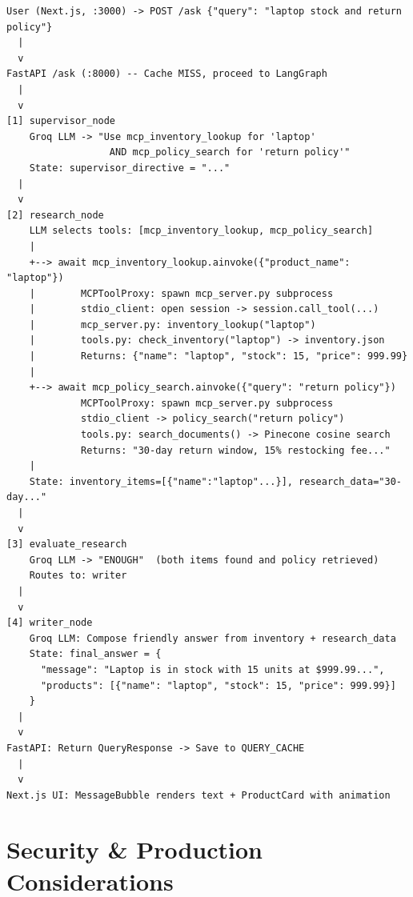 \documentclass[12pt]{article}
\begin{document}
\begin{lstlisting}
User (Next.js, :3000) -> POST /ask {"query": "laptop stock and return policy"}
  |
  v
FastAPI /ask (:8000) -- Cache MISS, proceed to LangGraph
  |
  v
[1] supervisor_node
    Groq LLM -> "Use mcp_inventory_lookup for 'laptop'
                  AND mcp_policy_search for 'return policy'"
    State: supervisor_directive = "..."
  |
  v
[2] research_node
    LLM selects tools: [mcp_inventory_lookup, mcp_policy_search]
    |
    +--> await mcp_inventory_lookup.ainvoke({"product_name": "laptop"})
    |        MCPToolProxy: spawn mcp_server.py subprocess
    |        stdio_client: open session -> session.call_tool(...)
    |        mcp_server.py: inventory_lookup("laptop")
    |        tools.py: check_inventory("laptop") -> inventory.json
    |        Returns: {"name": "laptop", "stock": 15, "price": 999.99}
    |
    +--> await mcp_policy_search.ainvoke({"query": "return policy"})
             MCPToolProxy: spawn mcp_server.py subprocess
             stdio_client -> policy_search("return policy")
             tools.py: search_documents() -> Pinecone cosine search
             Returns: "30-day return window, 15% restocking fee..."
    |
    State: inventory_items=[{"name":"laptop"...}], research_data="30-day..."
  |
  v
[3] evaluate_research
    Groq LLM -> "ENOUGH"  (both items found and policy retrieved)
    Routes to: writer
  |
  v
[4] writer_node
    Groq LLM: Compose friendly answer from inventory + research_data
    State: final_answer = {
      "message": "Laptop is in stock with 15 units at $999.99...",
      "products": [{"name": "laptop", "stock": 15, "price": 999.99}]
    }
  |
  v
FastAPI: Return QueryResponse -> Save to QUERY_CACHE
  |
  v
Next.js UI: MessageBubble renders text + ProductCard with animation
\end{lstlisting}

\section{Security \& Production Considerations}
\end{document}
